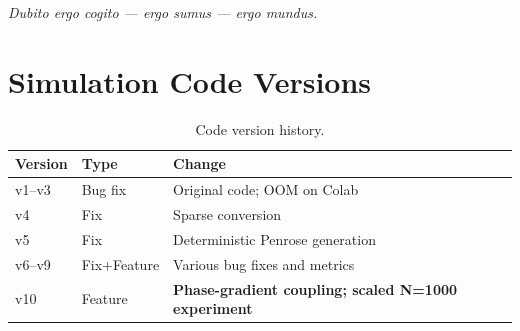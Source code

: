 \documentclass[12pt,a4paper]{article}
\theoremstyle{plain}
\theoremstyle{definition}
\begin{document}
\vspace{0.5cm}
\begin{center}
\textit{Dubito ergo cogito --- ergo sumus --- ergo mundus.}
\end{center}

\appendix

\section{Simulation Code Versions}
\label{app:code}

\begin{table}[H]
\centering
\caption{Code version history.}
\label{tab:versions}
\begin{tabular}{llp{8cm}}
\toprule
Version & Type & Change \\
\midrule
v1--v3  & Bug fix & Original code; OOM on Colab \\
v4      & Fix & Sparse conversion \\
v5      & Fix & Deterministic Penrose generation \\
v6--v9  & Fix+Feature & Various bug fixes and metrics \\
v10     & Feature & \textbf{Phase-gradient coupling; scaled N=1000 experiment} \\
\bottomrule
\end{tabular}
\end{table}
\end{document}
